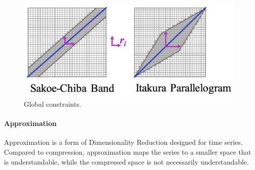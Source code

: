 \begin{figure}[h]
    \centering
    \includegraphics[width=0.7\linewidth]{img/dtw_global_constr.png}
    \caption{Global constraints.}
    \label{fig:dtw-global-constr}
\end{figure}

\paragraph{Approximation}

Approximation is a form of Dimensionality Reduction designed for time series. Compared to compression, approximation maps the series to a smaller space that is understandable, while the compressed space is not necessarily understandable.


